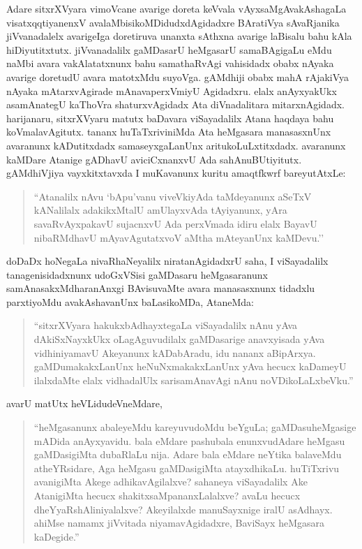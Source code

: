 Adare sitxrXVyara vimoVcane avarige doreta keVvala vAyxsaMgAvakAshagaLa visatxqqti\-yanenxV avalaMbisikoMDidudxdAgidadxre BAratiVya sAvaRjanika jiVvanadalelx avarige\break Iga doretiruva unanxta sAthxna avarige laBisalu bahu kAla hiDiyutitxtutx. jiVvana\-dalilx gaMDasarU heMgasarU samaBAgigaLu eMdu naMbi avara vakAlatatxnunx bahu samathaR\-vAgi vahisidadx obabx nAyaka avarige doretudU avara matotxMdu \hbox{suyoVga}. gAMdhiji obabx mahA rAjakiVya nAyaka mAtarxvAgirade mAnavaperxVmiyU Agidadxru. elalx anAyxyakUkx asamAnategU kaThoVra shaturxvAgidadx Ata diVnadalitara mitarxnAgidadx. harijanaru, sitxrXVyaru matutx baDavara viSayadalilx Atana haqdaya bahu koVmalavAgitutx. tananx huTaTxriviniMda Ata heMgasara manasasxnUnx avaranunx kADutitxdadx samaseyxgaLanUnx aritukoLuLxtitxdadx. avaranunx kaMDare Atanige gADhavU aviciCxnanxvU Ada sahAnuBUtiyitutx. gAMdhiVjiya vayxkitxtavxda I muKavanunx kuritu amaqtfkwrf bareyutAtxLe:

\begin{quote}
``Atanalilx nAvu `bApu'vanu viveVkiyAda taMdeyanunx aSeTxV kANalilalx adakikxMtalU amUlayxvAda tAyiyanunx, yAra savaR\-vAyxpakavU sujacnxvU Ada perxVmada idiru elalx BayavU nibaRMdhavU mAyavAgutatxvoV aMtha mAteyanUnx kaMDevu.''
\end{quote}

\eject

doDaDx hoNegaLa nivaRhaNeyalilx niratanAgidadxrU saha, I viSayadalilx tanagenisidadxnunx udoGxVSisi gaMDasaru heMgasaranunx samAnasakxMdharanAnxgi BAvisuvaMte avara manasasxnunx tidadxlu parxtiyoMdu avakAshavanUnx baLasikoMDa, AtaneMda:
\begin{quote}
``sitxrXVyara hakukxbAdhayxtegaLa viSayadalilx nAnu yAva dAkiSxNayxkUkx oLagAguvudilalx gaMDasarige anavxyisada yAva vidhiniyamavU Akeyanunx kADabAradu, idu nananx aBipArxya. gaMDumakakxLanUnx heNuNxmakakxLanUnx yAva hecucx kaDameyU ilalxdaMte elalx vidhadalUlx sarisamAnavAgi nAnu noVDikoLaLxbeVku.''
\end{quote}
avarU matUtx heVLidudeVneMdare,
\begin{quote}
``heMgasanunx abaleyeMdu kareyuvudoMdu beYguLa; gaMDasu\break heMgasige mADida anAyxyavidu. bala eMdare pashubala enunxvu\-dAdare heMgasu gaMDasigiMta dubaRlaLu nija. Adare bala eMdare neYtika balaveMdu atheYRsidare, Aga heMgasu gaMDasigiMta atayxdhikaLu. huTiTxrivu avanigiMta Akege adhikavAgilalxve? sahaneya viSayadalilx Ake AtanigiMta hecucx shakitxsaMpananxLalalxve? avaLu hecucx dheYyaRshAliniyalalxve? Akeyilalxde manuSayxnige iralU asAdhayx. ahiMse namamx jiVvitada niyamavAgidadxre, BaviSayx heMgasara kaDegide.''
\end{quote}

